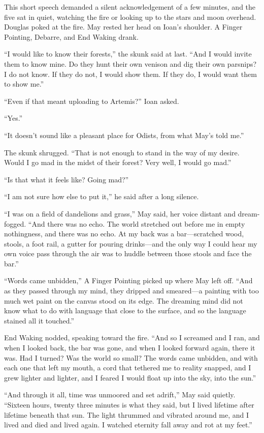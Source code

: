 This short speech demanded a silent acknowledgement of a few minutes, and the five sat in quiet, watching the fire or looking up to the stars and moon overhead. Douglas poked at the fire. May rested her head on Ioan's shoulder. A Finger Pointing, Debarre, and End Waking drank.

``I would like to know their forests,'' the skunk said at last. ``And I would invite them to know mine. Do they hunt their own venison and dig their own parsnips? I do not know. If they do not, I would show them. If they do, I would want them to show me.''

``Even if that meant uploading to Artemis?'' Ioan asked.

``Yes.''

``It doesn't sound like a pleasant place for Odists, from what May's told me.''

The skunk shrugged. ``That is not enough to stand in the way of my desire. Would I go mad in the midst of their forest? Very well, I would go mad.''

``Is that what it feels like? Going mad?''

``I am not sure how else to put it,'' he said after a long silence.

``I was on a field of dandelions and grass,'' May said, her voice distant and dream-fogged. ``And there was no echo. The world stretched out before me in empty nothingness, and there was no echo. At my back was a bar—scratched wood, stools, a foot rail, a gutter for pouring drinks—and the only way I could hear my own voice pass through the air was to huddle between those stools and face the bar.''

``Words came unbidden,'' A Finger Pointing picked up where May left off. ``And as they passed through my mind, they dripped and smeared—a painting with too much wet paint on the canvas stood on its edge. The dreaming mind did not know what to do with language that close to the surface, and so the language stained all it touched.''

End Waking nodded, speaking toward the fire. ``And so I screamed and I ran, and when I looked back, the bar was gone, and when I looked forward again, there it was. Had I turned? Was the world so small? The words came unbidden, and with each one that left my mouth, a cord that tethered me to reality snapped, and I grew lighter and lighter, and I feared I would float up into the sky, into the sun.''

``And through it all, time was unmoored and set adrift,'' May said quietly. ``Sixteen hours, twenty three minutes is what they said, but I lived lifetime after lifetime beneath that sun. The light thrummed and vibrated around me, and I lived and died and lived again. I watched eternity fall away and rot at my feet.''

